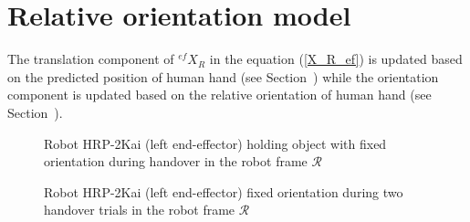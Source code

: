 \clearpage

\section{Relative orientation model}\label{relOri}
The translation component of ${}^{ef}{X}_R $ in the equation (\ref{X_R_ef}) is updated based on the predicted position of human hand (see Section~) while the orientation component is updated based on the relative orientation of human hand (see Section~).

\begin{figure}[htpb]
	\caption{Robot HRP-2Kai (left end-effector) holding object with fixed orientation during handover in the robot frame $\mathcal{R}$}
	\label{fig:robot_lt_hand_obj}
\end{figure} 

\begin{figure}[htpb]
	\caption{Robot HRP-2Kai (left end-effector) fixed orientation during two handover trials in the robot frame $\mathcal{R}$}
	\label{fig:robot_lt_hand_2layers}
\end{figure} 

